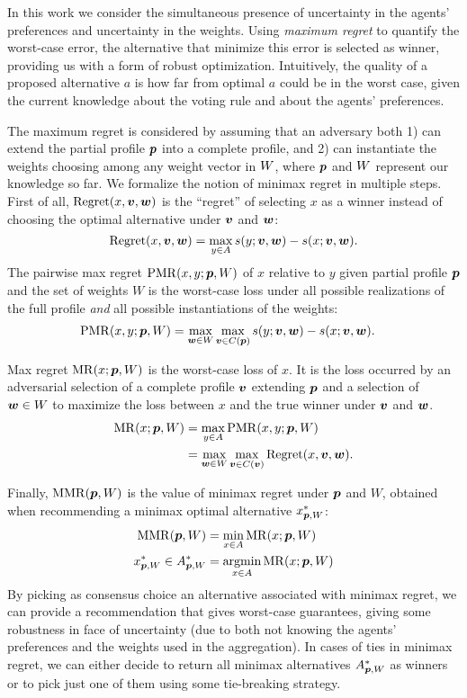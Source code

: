 In this work we consider the simultaneous presence of uncertainty in the agents' preferences and uncertainty in the weights.
Using {\em maximum regret} to quantify the worst-case error, the alternative that minimize this error is selected as winner, providing us with a form of robust optimization.
Intuitively, the quality of a proposed alternative $a$ is how far from optimal $a$  could be in the worst case, given the current knowledge about the voting rule and about the agents' preferences.

The maximum regret is considered by assuming that an adversary both 1) can extend the partial profile ${\bm{p}}$ into a complete profile, and 2) can instantiate the weights choosing among any weight vector in $W$, where ${\bm{p}}$ and $W$ represent our knowledge so far.
We formalize the notion of minimax regret in multiple steps.
First of all, $\operatorname{Regret}(x, \bm{v}, \bm{w})$ is the “regret” of selecting $x$ as a winner instead of choosing the optimal alternative under $\bm{v}$ and $\bm{w}$:
\[\operatorname{Regret}(x, \bm{v}, \bm{w}) = \max_{y \in A} s(y; \bm{v},\bm{w}) - s(x; \bm{v}, \bm{w}).\]
The pairwise max regret $\operatorname{PMR}(x,y;{\bm{p}},W)$ of $x$ relative to $y$ given partial profile ${\bm{p}}$ and the set of weights $W$
is the worst-case loss under all possible realizations of the full profile {\em and} all possible instantiations of the weights:
\begin{align}
\operatorname{PMR}(x,y; {\bm{p}}, W) & = \max_{\bm{w} \in W} \max_{\bm{v} \in C({\bm{p}})} s(y; \bm{v},\bm{w}) - s(x; \bm{v},\bm{w}).
\end{align}

Max regret $\operatorname{MR}(x;{\bm{p}},W)$ is the worst-case loss of $x$. It is the loss occurred by an adversarial selection of a complete profile $\bm{v}$ extending ${\bm{p}}$ and a selection of $\bm{w} \in W$ to maximize the loss between $x$ and the true winner under $\bm{v}$ and $\bm{w}$.
\begin{align}
\operatorname{MR}(x; {\bm{p}}, W) & = \max_{y \in A} \operatorname{PMR}(x,y; {\bm{p}}, W)\\
& = \max_{\bm{w} \in W} \max_{\bm{v} \in C(\bm{v})} \operatorname{Regret}(x, \bm{v}, \bm{w}).
\end{align}

Finally,  $\operatorname{MMR}({\bm{p}},W)$ is the value of minimax regret under ${\bm{p}}$ and $W$, obtained when recommending a minimax optimal alternative $x^*_{{\bm{p}}, W}$:
\begin{align*}
\operatorname{MMR}({\bm{p}},W) & = \min_{x \in A} \operatorname{MR}(x;{\bm{p}},W) \\
x^{*}_{{\bm{p}},W} \in A^*_{{\bm{p}}, W} & = \operatorname*{argmin}_{x \in A} \operatorname{MR}(x;{\bm{p}},W) 
\end{align*}
By picking as consensus choice
 an alternative associated with minimax regret, we can provide a recommendation that gives worst-case guarantees, giving some robustness in face of uncertainty (due to both not knowing the agents' preferences and the weights used in the aggregation). 
In cases of ties in minimax regret, we can either decide to return all minimax alternatives $A^*_{{\bm{p}}, W}$ as winners or to pick just one of them using some tie-breaking strategy.

